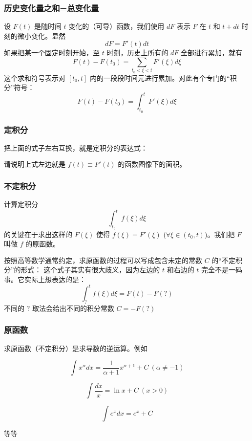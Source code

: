 \documentclass[CJK,13pt]{beamer}
\date{}
\begin{document}
  \bch



\begin{frame}
  \frametitle{历史变化量之和=总变化量}
  设 $F(t)$ 是随时间 $t$ 变化的（可导）函数，我们使用 $d F$ 表示 $F$ 在 $t$ 和 $t+dt$ 时刻的微小变化。显然
  $$ dF = F'(t) dt $$
  如果把某一个固定时刻开始，至 $t$ 时刻，历史上所有的 $dF$ 全部进行累加，就有
  $$ F(t) - F(t_0) = \sum_{t_0<\xi<t} F'(\xi) d\xi $$
  这个求和符号表示对 $[t_0,t]$ 内的一段段时间元进行累加。对此有个专门的“积分”符号：
  $$ F(t)-F(t_0) = \int_{t_0}^t F'(\xi) d\xi $$
\end{frame}


\begin{frame}
  \frametitle{定积分}
  把上面的式子左右互换，就是{\blue 定积分}的表达式：

  
  请说明上式左边就是 $f(t)\equiv F'(t)$ 的函数图像下的面积。
\end{frame}



\begin{frame}
  \frametitle{不定积分}
  计算定积分
  $$\int_{t_0}^tf(\xi)d\xi $$
  的关键在于求出这样的 $F(\xi)$ 使得 $f(\xi)= F'(\xi)$ ($\forall \xi\in (t_0,t)$)。我们把 $F$ 叫做 $f$ 的原函数。

  按照高等数学通常约定，求原函数的过程可以写成包含未定的常数 $C$ 的“不定积分”的形式：
       {\scriptsize
  这个式子其实有很大歧义，因为左边的 $t$ 和右边的 $t$ 完全不是一码事。它实际上想表达的是：
  $$\int_{?}^t f(\xi)d\xi  =  F(t) - F(?)$$
       不同的 $?$ 取法会给出不同的积分常数 $C = - F(?)$ }

\end{frame}



\begin{frame}
  \frametitle{原函数}
  求原函数（不定积分）是求导数的逆运算。例如

  $$\int x^\alpha dx = \frac{1}{\alpha+1}x^{\alpha+1}+C \ (\alpha\ne -1)$$
  
  $$\int \frac{dx}{x} = \ln x + C  \ (x>0) $$
  
  $$\int e^x dx =  e^x + C $$

  等等
\end{frame}
\end{document}
